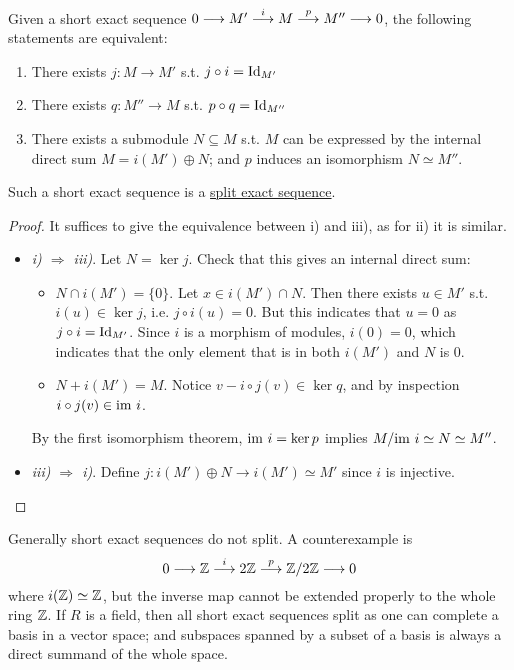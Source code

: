 \documentclass{article}
\begin{document}
\begin{proposition}\label{prop:criterion for split}
    Given a short exact sequence $0 \longrightarrow M' \overset{i}{\longrightarrow} M \overset{p}{\longrightarrow} M'' \longrightarrow 0$, the following statements are equivalent:
    \begin{enumerate}[label=\roman*)]
        \item There exists $j: M \to M'$ s.t. $j \circ i = \mathrm{Id}_{M'}$
        \item There exists $q: M'' \to M$ s.t. $p \circ q = \mathrm{Id}_{M''}$
        \item There exists a submodule $N \subseteq M$ s.t. $M$ can be expressed by the internal direct sum $M = i(M') \oplus N$; and $p$ induces an isomorphism $N \simeq M''$.
    \end{enumerate}
    Such a short exact sequence is a \underline{split exact sequence}.
\end{proposition}

\begin{proof}
    It suffices to give the equivalence between i) and iii), as for ii) it is similar.
    \begin{itemize}
        \item \emph{i) $\Rightarrow$ iii)}. Let $N = \ker j$. Check that this gives an internal direct sum:
            \begin{itemize}
                \item $N \cap i(M') = \{0\}$. Let $x \in i(M') \cap N$. Then there exists $u \in M'$ s.t. $i(u) \in \ker j$, i.e. $j\circ i(u) = 0$. But this indicates that $u = 0$ as $j \circ i = \mathrm{Id}_{M'}$. Since $i$ is a morphism of modules, $i(0) = 0$, which indicates that the only element that is in both $i(M')$ and $N$ is 0.
                \item $N + i(M') = M$. Notice $v - i \circ j(v) \in \ker q$, and by inspection $i\circ j(v) \in \mathrm{im}\  i$.
            \end{itemize}
            By the first isomorphism theorem, $\mathrm{im}\  i = \ker p$ implies $M / \mathrm{im}\  i \simeq N \simeq M''$.
        \item \emph{iii) $\Rightarrow$ i)}. Define $j: i(M') \oplus N \to i(M') \simeq M'$ since $i$ is injective.
    \end{itemize}
\end{proof}

\begin{remark}
    Generally short exact sequences do not split. A counterexample is
    \[
        0 \longrightarrow \mathbb{Z} \overset{i}{\longrightarrow} 2\mathbb{Z} \overset{p}{\longrightarrow} \mathbb{Z}/2\mathbb{Z} \longrightarrow 0
    \]
    where $i(\mathbb{Z}) \simeq \mathbb{Z}$, but the inverse map cannot be extended properly to the whole ring $\mathbb{Z}$. If $R$ is a field, then all short exact sequences split as one can complete a basis in a vector space; and subspaces spanned by a subset of a basis is always a direct summand of the whole space.
\end{remark}
\end{document}
